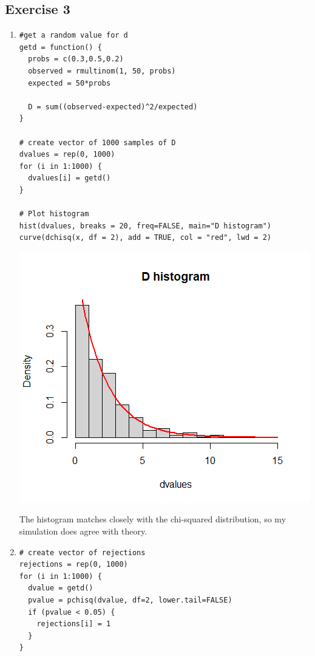 \documentclass{article}
\begin{document}
\subsection*{Exercise 3}
\begin{enumerate}
	\item \begin{lstlisting}
#get a random value for d
getd = function() {
  probs = c(0.3,0.5,0.2)
  observed = rmultinom(1, 50, probs)
  expected = 50*probs
  
  D = sum((observed-expected)^2/expected)
}

# create vector of 1000 samples of D
dvalues = rep(0, 1000)
for (i in 1:1000) {
  dvalues[i] = getd()
}

# Plot histogram
hist(dvalues, breaks = 20, freq=FALSE, main="D histogram")
curve(dchisq(x, df = 2), add = TRUE, col = "red", lwd = 2)
	\end{lstlisting}
	\includegraphics[scale=0.7]{parta.png}

	The histogram matches closely with the chi-squared distribution,
	so my simulation does agree with theory.
	\newpage 
	\item \begin{lstlisting}
# create vector of rejections
rejections = rep(0, 1000)
for (i in 1:1000) {
  dvalue = getd()
  pvalue = pchisq(dvalue, df=2, lower.tail=FALSE)
  if (pvalue < 0.05) {
    rejections[i] = 1
  }
}


\end{lstlisting}
\end{enumerate}
\end{document}
